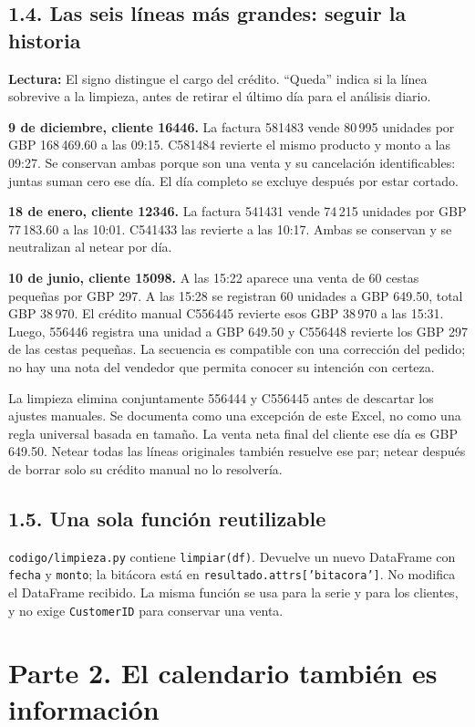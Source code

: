 \documentclass[11pt,letterpaper]{article}
\newcommand{\tabla}[2]{\begin{center}\small\textbf{Lectura:} #2\end{center}}
\begin{document}
\subsection{1.4. Las seis líneas más grandes: seguir la historia}
\tabla{extremos}{El signo distingue el cargo del crédito. ``Queda'' indica si la línea sobrevive a la limpieza, antes de retirar el último día para el análisis diario.}
\textbf{9 de diciembre, cliente 16446.} La factura 581483 vende 80\,995 unidades por GBP 168\,469.60 a las 09:15. C581484 revierte el mismo producto y monto a las 09:27. Se conservan ambas porque son una venta y su cancelación identificables: juntas suman cero ese día. El día completo se excluye después por estar cortado.

\textbf{18 de enero, cliente 12346.} La factura 541431 vende 74\,215 unidades por GBP 77\,183.60 a las 10:01. C541433 las revierte a las 10:17. Ambas se conservan y se neutralizan al netear por día.

\textbf{10 de junio, cliente 15098.} A las 15:22 aparece una venta de 60 cestas pequeñas por GBP 297. A las 15:28 se registran 60 unidades a GBP 649.50, total GBP 38\,970. El crédito manual C556445 revierte esos GBP 38\,970 a las 15:31. Luego, 556446 registra una unidad a GBP 649.50 y C556448 revierte los GBP 297 de las cestas pequeñas. La secuencia es compatible con una corrección del pedido; no hay una nota del vendedor que permita conocer su intención con certeza.

La limpieza elimina conjuntamente 556444 y C556445 antes de descartar los ajustes manuales. Se documenta como una excepción de este Excel, no como una regla universal basada en tamaño. La venta neta final del cliente ese día es GBP 649.50. Netear todas las líneas originales también resuelve ese par; netear después de borrar solo su crédito manual no lo resolvería.

\subsection{1.5. Una sola función reutilizable}
\texttt{codigo/limpieza.py} contiene \texttt{limpiar(df)}. Devuelve un nuevo DataFrame con \texttt{fecha} y \texttt{monto}; la bitácora está en \texttt{resultado.attrs['bitacora']}. No modifica el DataFrame recibido. La misma función se usa para la serie y para los clientes, y no exige \texttt{CustomerID} para conservar una venta.

\section{Parte 2. El calendario también es información}
\end{document}
